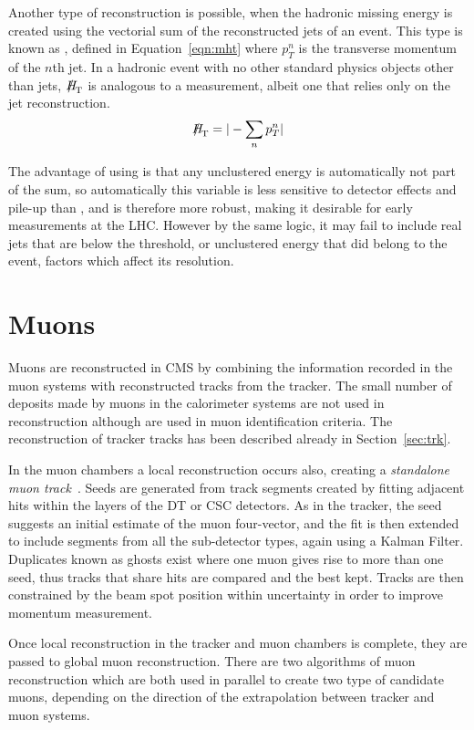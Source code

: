 Another type of \met reconstruction is possible, when the hadronic missing energy is created using the vectorial sum of the reconstructed jets of an event. This type is known as \MHT, defined in Equation~\ref{eqn:mht} where $p_{T}^{n}$ is the transverse momentum of the $n$th jet.  In a hadronic event with no other standard physics objects other than jets, $\MHT$ is analogous to a \met measurement, albeit one that relies only on the jet reconstruction. 
\begin{equation}
\MHT = | - \sum_{n} p_{T}^{n}|
\label{eqn:mht}
\end{equation}

The advantage of using \MHT is that any unclustered energy is automatically not part of the sum, so automatically this variable is less sensitive to detector effects and pile-up than \met, and is therefore more robust, making it desirable for early measurements at the LHC. However by the same logic, it may fail to include real jets that are below the threshold, or unclustered energy that did belong to the event, factors which affect its resolution. 

\section{Muons}
\label{sec:muona}
Muons are reconstructed in CMS by combining the information recorded in the muon systems with reconstructed tracks from the tracker. The small number of deposits made by muons in the calorimeter systems are not used in reconstruction although are used in muon identification criteria. The reconstruction of tracker tracks has been described already in Section~\ref{sec:trk}. 

In the muon chambers a local reconstruction occurs also, creating a \textit{standalone muon track}~\cite{muonperf}. Seeds are generated from track segments created by fitting adjacent hits within the layers of the DT or CSC detectors. As in the tracker, the seed suggests an initial estimate of the muon four-vector, and the fit is then extended to include segments from all the sub-detector types, again using a Kalman Filter. Duplicates known as ghosts exist where one muon gives rise to more than one seed, thus tracks that share hits are compared and the best kept. Tracks are then constrained by the beam spot position within uncertainty in order to improve momentum measurement. 

Once local reconstruction in the tracker and muon chambers is complete, they are passed to global muon reconstruction. There are two algorithms of muon reconstruction which are both used in parallel to create two type of candidate muons, depending on the direction of the extrapolation between tracker and muon systems. 

